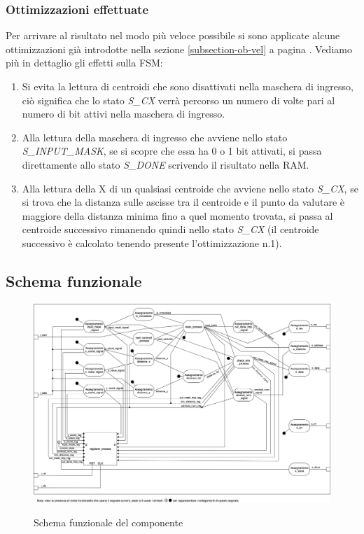 \documentclass{article}
\begin{document}
\subsubsection{Ottimizzazioni effettuate} \label{subsection-ottimiz-fsm}
Per arrivare al risultato nel modo più veloce possibile si sono applicate alcune ottimizzazioni già introdotte nella sezione \ref{subsection-ob-vel} a pagina \pageref{subsection-ob-vel}. Vediamo più in dettaglio gli effetti sulla FSM:
\begin{enumerate}
    \item Si evita la lettura di centroidi che sono disattivati nella maschera di ingresso, ciò significa che lo stato \textit{S\_CX} verrà percorso un numero di volte pari al numero di bit attivi nella maschera di ingresso. 
    \item Alla lettura della maschera di ingresso che avviene nello stato \textit{S\_INPUT\_MASK}, se si scopre che essa ha 0 o 1 bit attivati, si passa direttamente allo stato \textit{S\_DONE} scrivendo il risultato nella RAM.
    \item Alla lettura della X di un qualsiasi centroide che avviene nello stato \textit{S\_CX}, se si trova che la distanza sulle ascisse tra il centroide e il punto da valutare è maggiore della distanza minima fino a quel momento trovata, si passa al centroide successivo rimanendo quindi nello stato \textit{S\_CX} (il centroide successivo è calcolato tenendo presente l'ottimizzazione n.1).
\end{enumerate}

\subsection{Schema funzionale} \label{subsection-schema-funz}
\begin{figure}[H]
    \centering
    \caption{Schema funzionale del componente}
    \includegraphics[width=1.0\textwidth]{images/Schema.png}
    \label{fig:Schema}
\end{figure}
\end{document}
